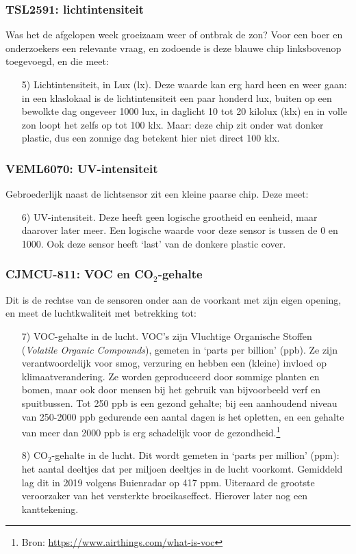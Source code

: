 \documentclass[a4paper,11pt, fleqn]{article}
\begin{document}
\subsubsection{TSL2591: lichtintensiteit}
Was het de afgelopen week groeizaam weer of ontbrak de zon? Voor een boer en onderzoekers een relevante vraag, en zodoende is deze blauwe chip linksbovenop toegevoegd, en die meet:
\begin{itemize}
	\item[5)] Lichtintensiteit, in Lux (lx). Deze waarde kan erg hard heen en weer gaan: in een klaslokaal is de lichtintensiteit een paar honderd lux, buiten op een bewolkte dag ongeveer 1000 lux, in daglicht 10 tot 20 kilolux (klx) en in volle zon loopt het zelfs op tot 100 klx. Maar: deze chip zit onder wat donker plastic, dus een zonnige dag betekent hier niet direct 100 klx.
\end{itemize}

\subsubsection{VEML6070: UV-intensiteit}
Gebroederlijk naast de lichtsensor zit een kleine paarse chip. Deze meet:
\begin{itemize}
	\item[6)] UV-intensiteit. Deze heeft geen logische grootheid en eenheid, maar daarover later meer. Een logische waarde voor deze sensor is tussen de 0 en 1000. Ook deze sensor heeft `last' van de donkere plastic cover.
\end{itemize}

\subsubsection{CJMCU-811: VOC en CO$_2$-gehalte}
Dit is de rechtse van de sensoren onder aan de voorkant met zijn eigen opening, en meet de luchtkwaliteit met betrekking tot:
\begin{itemize}
	\item[7)] VOC-gehalte in de lucht. VOC's zijn Vluchtige Organische Stoffen ({\it Volatile Organic Compounds}), gemeten in `parts per billion' (ppb). Ze zijn verantwoordelijk voor smog, verzuring en hebben een (kleine) invloed op klimaatverandering. Ze worden geproduceerd door sommige planten en bomen, maar ook door mensen bij het gebruik van bijvoorbeeld verf en spuitbussen. Tot 250 ppb is een gezond gehalte; bij een aanhoudend niveau van 250-2000 ppb gedurende een aantal dagen is het opletten, en een gehalte van meer dan 2000 ppb is erg schadelijk voor de gezondheid.\footnote{Bron: \href{https://www.airthings.com/what-is-voc}{https://www.airthings.com/what-is-voc}}
	\item[8)] CO$_2$-gehalte in de lucht. Dit wordt gemeten in `parts per million' (ppm): het aantal deeltjes dat per miljoen deeltjes in de lucht voorkomt. Gemiddeld lag dit in 2019 volgens Buienradar op 417 ppm. Uiteraard de grootste veroorzaker van het versterkte broeikaseffect. Hierover later nog een kanttekening.
\end{itemize}
\end{document}
